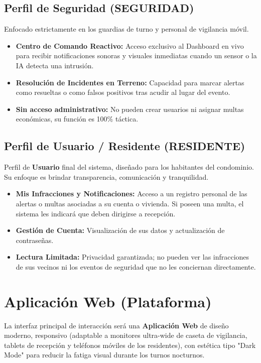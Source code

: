\documentclass[12pt,a4paper]{article}
\begin{document}
\subsection{Perfil de Seguridad (SEGURIDAD)}
Enfocado estrictamente en los guardias de turno y personal de vigilancia móvil.
\begin{itemize}
    \item \textbf{Centro de Comando Reactivo:} Acceso exclusivo al Dashboard en vivo para recibir notificaciones sonoras y visuales inmediatas cuando un sensor o la IA detecta una intrusión.
    \item \textbf{Resolución de Incidentes en Terreno:} Capacidad para marcar alertas como resueltas o como falsos positivos tras acudir al lugar del evento.
    \item \textbf{Sin acceso administrativo:} No pueden crear usuarios ni asignar multas económicas, su función es 100\% táctica.
\end{itemize}

\subsection{Perfil de Usuario / Residente (RESIDENTE)}
Perfil de \textbf{Usuario} final del sistema, diseñado para los habitantes del condominio. Su enfoque es brindar transparencia, comunicación y tranquilidad.
\begin{itemize}
    \item \textbf{Mis Infracciones y Notificaciones:} Acceso a un registro personal de las alertas o multas asociadas a su cuenta o vivienda. Si poseen una multa, el sistema les indicará que deben dirigirse a recepción.
    \item \textbf{Gestión de Cuenta:} Visualización de sus datos y actualización de contraseñas.
    \item \textbf{Lectura Limitada:} Privacidad garantizada; no pueden ver las infracciones de sus vecinos ni los eventos de seguridad que no les conciernan directamente.
\end{itemize}

\section{Aplicación Web (Plataforma)}
La interfaz principal de interacción será una \textbf{Aplicación Web} de diseño moderno, responsivo (adaptable a monitores ultra-wide de caseta de vigilancia, tablets de recepción y teléfonos móviles de los residentes), con estética tipo "Dark Mode" para reducir la fatiga visual durante los turnos nocturnos.
\end{document}
